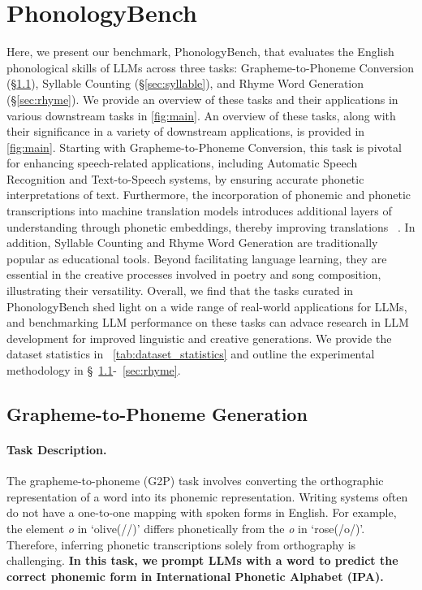 \section{PhonologyBench}
Here, we present our benchmark, PhonologyBench, that evaluates the English phonological skills of LLMs across three tasks: Grapheme-to-Phoneme Conversion (\S \ref{sec:g2p}), Syllable Counting (\S \ref{sec:syllable}), and Rhyme Word Generation (\S \ref{sec:rhyme}). We provide an overview of these tasks and their applications in various downstream tasks in \autoref{fig:main}. An overview of these tasks, along with their significance in a variety of downstream applications, is provided in \autoref{fig:main}. Starting with Grapheme-to-Phoneme Conversion, this task is pivotal for enhancing speech-related applications, including Automatic Speech Recognition and Text-to-Speech systems, by ensuring accurate phonetic interpretations of text. Furthermore, the incorporation of phonemic and phonetic transcriptions into machine translation models introduces additional layers of understanding through phonetic embeddings, thereby improving translations ~\citep{liu-etal-2019-robust, chakravarthi2019multilingual}. In addition, Syllable Counting and Rhyme Word Generation are traditionally popular as educational tools. Beyond facilitating language learning, they are essential in the creative processes involved in poetry and song composition, illustrating their versatility. Overall, we find that the tasks curated in PhonologyBench shed light on a wide range of real-world applications for LLMs, and benchmarking LLM performance on these tasks can advace research in LLM development for improved linguistic and creative generations. We provide the dataset statistics in ~\autoref{tab:dataset_statistics} and outline the experimental methodology in \S ~\ref{sec:g2p}-~\ref{sec:rhyme}. 

\subsection{Grapheme-to-Phoneme Generation}
\label{sec:g2p}
\paragraph{Task Description.} The grapheme-to-phoneme (G2P) task involves converting the orthographic representation of a word into its phonemic representation.  Writing systems often do not have a one-to-one mapping with spoken forms in English. For example, the element \textit{o} in `olive(/\textscripta/)' differs phonetically from the \textit{o} in `rose(/o\textupsilon/)'. Therefore, inferring phonetic transcriptions solely from orthography is challenging. \textbf{In this task, we prompt LLMs with a word to predict the correct phonemic form in International Phonetic Alphabet (IPA).} 

